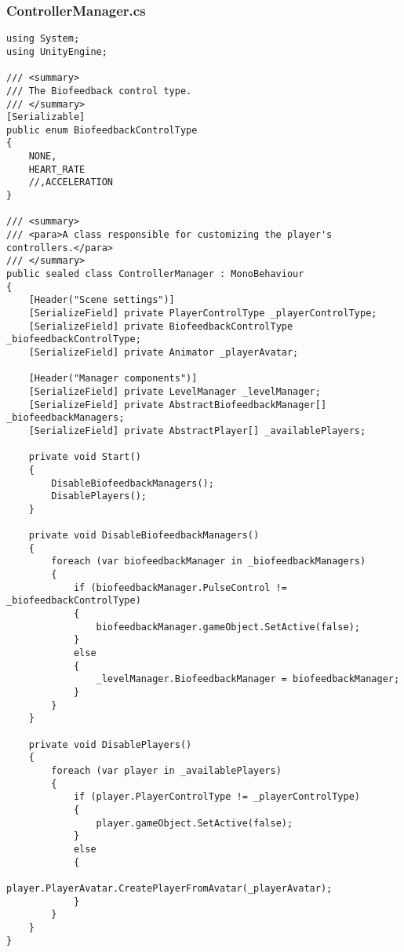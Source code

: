 \subsubsection*{ControllerManager.cs}
\begin{verbatim}
using System;
using UnityEngine;

/// <summary>
/// The Biofeedback control type.
/// </summary>
[Serializable]
public enum BiofeedbackControlType
{
    NONE,
    HEART_RATE
    //,ACCELERATION
}

/// <summary>
/// <para>A class responsible for customizing the player's controllers.</para>
/// </summary>
public sealed class ControllerManager : MonoBehaviour
{
    [Header("Scene settings")] 
    [SerializeField] private PlayerControlType _playerControlType;
    [SerializeField] private BiofeedbackControlType _biofeedbackControlType;
    [SerializeField] private Animator _playerAvatar;

    [Header("Manager components")]
    [SerializeField] private LevelManager _levelManager;
    [SerializeField] private AbstractBiofeedbackManager[] _biofeedbackManagers;
    [SerializeField] private AbstractPlayer[] _availablePlayers;

    private void Start()
    {
        DisableBiofeedbackManagers();
        DisablePlayers();
    }

    private void DisableBiofeedbackManagers()
    {
        foreach (var biofeedbackManager in _biofeedbackManagers)
        {
            if (biofeedbackManager.PulseControl != _biofeedbackControlType)
            {
                biofeedbackManager.gameObject.SetActive(false);
            }
            else
            {
                _levelManager.BiofeedbackManager = biofeedbackManager;
            }
        }
    }

    private void DisablePlayers()
    {
        foreach (var player in _availablePlayers)
        {
            if (player.PlayerControlType != _playerControlType)
            {
                player.gameObject.SetActive(false);
            }
            else
            {
                player.PlayerAvatar.CreatePlayerFromAvatar(_playerAvatar);
            }
        }
    }
}
\end{verbatim}
